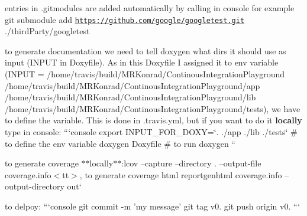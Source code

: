 \begin{DoxyItemize}
\item entries in {\ttfamily .gitmodules} are added automatically by calling in console for example {\ttfamily git submodule add \href{https://github.com/google/googletest.git}{\tt https\-://github.\-com/google/googletest.\-git} ./third\-Party/googletest}
\begin{DoxyItemize}
\item to generate documentation we need to tell doxygen what dirs it should use as input ({\ttfamily I\-N\-P\-U\-T} in Doxyfile). As in this Doxyfile I assigned it to env variable ({\ttfamily I\-N\-P\-U\-T = /home/travis/build/\-M\-R\-Konrad/\-Continous\-Integration\-Playground /home/travis/build/\-M\-R\-Konrad/\-Continous\-Integration\-Playground/app /home/travis/build/\-M\-R\-Konrad/\-Continous\-Integration\-Playground/lib /home/travis/build/\-M\-R\-Konrad/\-Continous\-Integration\-Playground/tests}), we have to define the variable. This is done in {\ttfamily .travis.\-yml}, but if you want to do it {\bfseries locally} type in console\-: ```console export I\-N\-P\-U\-T\-\_\-\-F\-O\-R\-\_\-\-D\-O\-X\-Y=\char`\"{}. ./app ./lib ./tests\char`\"{} \# to define the env variable doxygen Doxyfile \# to run doxygen ``{\ttfamily }
\end{DoxyItemize}
\item {\ttfamily to generate coverage $\ast$$\ast$locally$\ast$$\ast$\-:}lcov --capture --directory . --output-\/file coverage.\-info$<$tt$>$, to generate coverage html reportgenhtml coverage.\-info --output-\/directory out`
\item to delpoy\-: ```console git commit -\/m 'my message' git tag v0. git push origin v0. ``` 
\end{DoxyItemize}